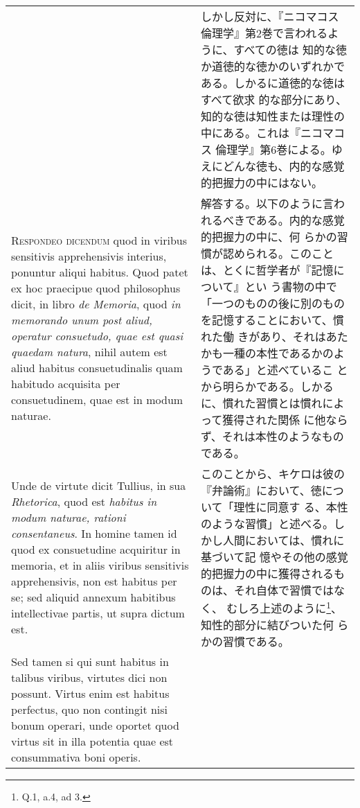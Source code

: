 \documentclass[10pt]{jsarticle}
\begin{document}
\begin{longtable}{p{21em}p{21em}}
&

しかし反対に、『ニコマコス倫理学』第2巻で言われるように、すべての徳は
知的な徳か道徳的な徳かのいずれかである。しかるに道徳的な徳はすべて欲求
的な部分にあり、知的な徳は知性または理性の中にある。これは『ニコマコス
倫理学』第6巻による。ゆえにどんな徳も、内的な感覚的把握力の中にはない。
 
\\

 {\scshape Respondeo dicendum} quod in viribus sensitivis
 apprehensivis interius, ponuntur aliqui habitus. Quod patet ex hoc
 praecipue quod philosophus dicit, in libro {\itshape de Memoria},
 quod {\itshape in memorando unum post aliud, operatur consuetudo,
 quae est quasi quaedam natura}, nihil autem est aliud habitus
 consuetudinalis quam habitudo acquisita per consuetudinem, quae est
 in modum naturae.

 &

解答する。以下のように言われるべきである。内的な感覚的把握力の中に、何
らかの習慣が認められる。このことは、とくに哲学者が『記憶について』とい
う書物の中で「一つのものの後に別のものを記憶することにおいて、慣れた働
きがあり、それはあたかも一種の本性であるかのようである」と述べているこ
とから明らかである。しかるに、慣れた習慣とは慣れによって獲得された関係
に他ならず、それは本性のようなものである。
 
 \\
 
 
 Unde de virtute dicit Tullius, in sua {\itshape Rhetorica}, quod est
 {\itshape habitus in modum naturae, rationi consentaneus}. In homine
 tamen id quod ex consuetudine acquiritur in memoria, et in aliis
 viribus sensitivis apprehensivis, non est habitus per se; sed aliquid
 annexum habitibus intellectivae partis, ut supra dictum est.

 &

このことから、キケロは彼の『弁論術』において、徳について「理性に同意す
る、本性のような習慣」と述べる。しかし人間においては、慣れに基づいて記
憶やその他の感覚的把握力の中に獲得されるものは、それ自体で習慣ではなく、
むしろ上述のように\footnote{Q.1, a.4, ad 3.}、知性的部分に結びついた何
らかの習慣である。
 
 \\

 Sed tamen si qui sunt habitus in talibus viribus, virtutes dici non
 possunt. Virtus enim est habitus perfectus, quo non contingit nisi
 bonum operari, unde oportet quod virtus sit in illa potentia quae est
 consummativa boni operis.


\end{longtable}
\end{document}
